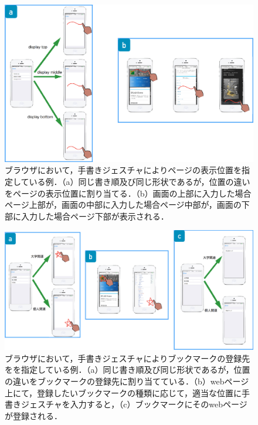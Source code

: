 \begin{figure} [h!]
	\begin{center}
		\includegraphics [width=1.0\hsize ]{img/phone_web.eps}
	\end{center}
	\caption{ブラウザにおいて，手書きジェスチャによりページの表示位置を指定している例．（a）同じ書き順及び同じ形状であるが，位置の違いをページの表示位置に割り当てる．（b）画面の上部に入力した場合ページ上部が，画面の中部に入力した場合ページ中部が，画面の下部に入力した場合ページ下部が表示される．}
	\label{fig:phone_web}
\end{figure}

\begin{figure} [h!]
	\begin{center}
		\includegraphics [width=1.0\hsize ]{img/phone_bookmark.eps}
	\end{center}
	\caption{ブラウザにおいて，手書きジェスチャによりブックマークの登録先をを指定している例．（a）同じ書き順及び同じ形状であるが，位置の違いをブックマークの登録先に割り当てている．（b）webページ上にて，登録したいブックマークの種類に応じて，適当な位置に手書きジェスチャを入力すると，（c）ブックマークにそのwebページが登録される．}
	\label{fig:phone_bookmark}
\end{figure}

